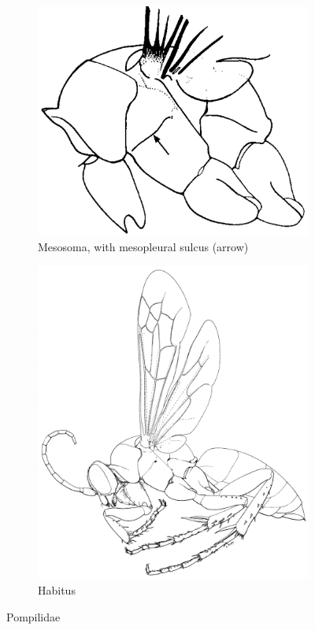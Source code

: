 \documentclass[letterpaper, 11pt]{article}
\begin{document}
\begin{figure}[ht!]
    \centering
    \begin{subfigure}[ht!]{0.32\textwidth}
        \includegraphics[width=\textwidth]{PompilidMesosoma}
        \caption{Mesosoma, with mesopleural sulcus (arrow) \citep[][pg. 170]{goulet1993hymenoptera}}
        \label{fig:pompilid2}
    \end{subfigure}
    \qquad
    \begin{subfigure}[ht!]{0.38\textwidth}
        \includegraphics[width=\textwidth]{PompilidHabitus}
        \caption{Habitus \citep[][Fig. 71]{goulet1993hymenoptera}}
        \label{fig:pompilid3}
    \end{subfigure}
    \caption{Pompilidae}\label{fig:pompilid}
\end{figure}
\end{document}

